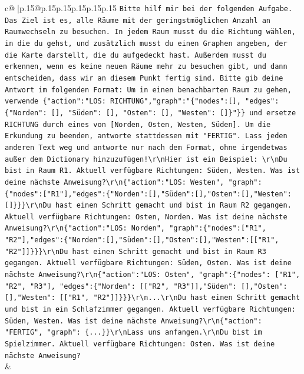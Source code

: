 \documentclass{article}
\begin{document}
{\begin{supertabular}{c@{$\;$}|p{.15\linewidth}@{}p{.15\linewidth}p{.15\linewidth}p{.15\linewidth}p{.15\linewidth}p{.15\linewidth}}
{{{                \texttt{Bitte hilf mir bei der folgenden Aufgabe. Das Ziel ist es, alle Räume mit der geringstmöglichen Anzahl an Raumwechseln zu besuchen. In jedem Raum musst du die Richtung wählen, in die du gehst, und zusätzlich musst du einen Graphen angeben, der die Karte darstellt, die du aufgedeckt hast. Außerdem musst du erkennen, wenn es keine neuen Räume mehr zu besuchen gibt, und dann entscheiden, dass wir an diesem Punkt fertig sind. Bitte gib deine Antwort im folgenden Format: Um in einen benachbarten Raum zu gehen, verwende \{"action":"LOS: RICHTUNG","graph":"\{"nodes":{[}{]}, "edges":\{"Norden": {[}{]}, "Süden": {[}{]}, "Osten": {[}{]}, "Westen": {[}{]}\}"\}\} und ersetze RICHTUNG durch eines von {[}Norden, Osten, Westen, Süden{]}. Um die Erkundung zu beenden, antworte stattdessen mit "FERTIG". Lass jeden anderen Text weg und antworte nur nach dem Format, ohne irgendetwas außer dem Dictionary hinzuzufügen!\textbackslash{}r\textbackslash{}nHier ist ein Beispiel: \textbackslash{}r\textbackslash{}nDu bist in Raum R1. Aktuell verfügbare Richtungen: Süden, Westen. Was ist deine nächste Anweisung?\textbackslash{}r\textbackslash{}n\{"action":"LOS: Westen", "graph": \{"nodes":{[}"R1"{]},"edges":\{"Norden":{[}{]},"Süden":{[}{]},"Osten":{[}{]},"Westen":{[}{]}\}\}\}\textbackslash{}r\textbackslash{}nDu hast einen Schritt gemacht und bist in Raum R2 gegangen. Aktuell verfügbare Richtungen: Osten, Norden. Was ist deine nächste Anweisung?\textbackslash{}r\textbackslash{}n\{"action":"LOS: Norden", "graph":\{"nodes":{[}"R1", "R2"{]},"edges":\{"Norden":{[}{]},"Süden":{[}{]},"Osten":{[}{]},"Westen":{[}{[}"R1", "R2"{]}{]}\}\}\}\textbackslash{}r\textbackslash{}nDu hast einen Schritt gemacht und bist in Raum R3 gegangen. Aktuell verfügbare Richtungen: Süden, Osten. Was ist deine nächste Anweisung?\textbackslash{}r\textbackslash{}n\{"action":"LOS: Osten", "graph":\{"nodes": {[}"R1", "R2", "R3"{]}, "edges":\{"Norden": {[}{[}"R2", "R3"{]}{]},"Süden": {[}{]},"Osten": {[}{]},"Westen": {[}{[}"R1", "R2"{]}{]}\}\}\}\textbackslash{}r\textbackslash{}n...\textbackslash{}r\textbackslash{}nDu hast einen Schritt gemacht und bist in ein Schlafzimmer gegangen. Aktuell verfügbare Richtungen: Süden, Westen. Was ist deine nächste Anweisung?\textbackslash{}r\textbackslash{}n\{"action": "FERTIG", "graph": \{...\}\}\textbackslash{}r\textbackslash{}nLass uns anfangen.\textbackslash{}r\textbackslash{}nDu bist im Spielzimmer. Aktuell verfügbare Richtungen: Osten. Was ist deine nächste Anweisung?} \\
            }
        }
    }
    & \\ \\


\end{supertabular}}
\end{document}
